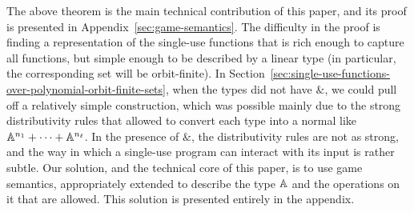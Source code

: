The above theorem is the main technical contribution of this paper, and its proof is presented in Appendix~\ref{sec:game-semantics}. The difficulty in the proof is finding a representation of the single-use  functions that is rich enough to capture all functions, but simple enough to be described by a linear type (in particular, the corresponding set will be orbit-finite). In  Section~\ref{sec:single-use-functions-over-polynomial-orbit-finite-sets}, when the types did not have $\&$, we could pull off a relatively simple construction, which was possible mainly due to the strong distributivity rules that allowed to convert each type into a normal like $\mathbb A^{n_1} + \cdots + \mathbb A^{n_\ell}$. In the presence of $\&$, the distributivity rules are not as strong, and the way in which a single-use program can interact with its input is rather subtle. 
Our solution, and the technical core of this paper, is to use game semantics, appropriately extended to describe the type $\mathbb A$ and the operations on it that are allowed. This solution is presented entirely in the appendix.









